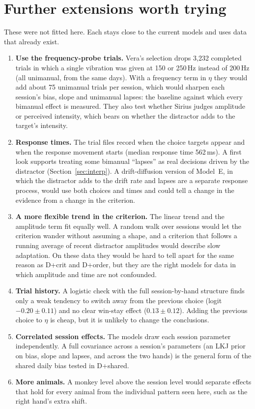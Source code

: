\section{Further extensions worth trying}\label{sec:further}

These were not fitted here. Each stays close to the current models and uses data that already exist.

\begin{enumerate}[leftmargin=1.6em]
\item \textbf{Use the frequency-probe trials.}
Vera's selection drops 3,232 completed trials in which a single vibration was given at 150 or 250\,Hz instead of 200\,Hz (all unimanual, from the same days).
With a frequency term in $\eta$ they would add about 75 unimanual trials per session, which would sharpen each session's bias, slope and unimanual lapses: the baseline against which every bimanual effect is measured.
They also test whether Sirius judges amplitude or perceived intensity, which bears on whether the distractor adds to the target's intensity.

\item \textbf{Response times.}
The trial files record when the choice targets appear and when the response movement starts (median response time 562\,ms).
A first look supports treating some bimanual ``lapses'' as real decisions driven by the distractor (Section~\ref{sec:interp}).
A drift-diffusion version of Model~E, in which the distractor adds to the drift rate and lapses are a separate response process, would use both choices and times and could tell a change in the evidence from a change in the criterion.

\item \textbf{A more flexible trend in the criterion.}
The linear trend and the amplitude term fit equally well. A random walk over sessions would let the criterion wander without assuming a shape, and a criterion that follows a running average of recent distractor amplitudes would describe slow adaptation. On these data they would be hard to tell apart for the same reason as D+crit and D+order, but they are the right models for data in which amplitude and time are not confounded.

\item \textbf{Trial history.}
A logistic check with the full session-by-hand structure finds only a weak tendency to switch away from the previous choice (logit $-0.20\pm0.11$) and no clear win-stay effect ($0.13\pm0.12$).
Adding the previous choice to $\eta$ is cheap, but it is unlikely to change the conclusions.

\item \textbf{Correlated session effects.}
The models draw each session parameter independently. A full covariance across a session's parameters (an LKJ prior on bias, slope and lapses, and across the two hands) is the general form of the shared daily bias tested in D+shared.

\item \textbf{More animals.}
A monkey level above the session level would separate effects that hold for every animal from the individual pattern seen here, such as the right hand's extra shift.
\end{enumerate}
